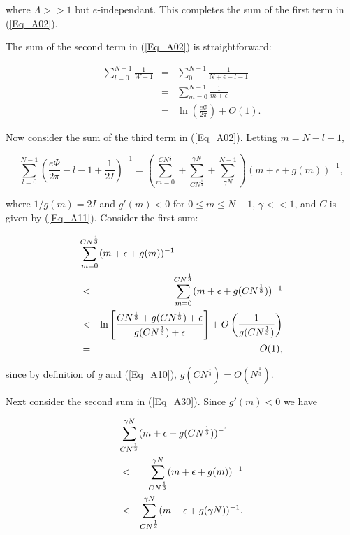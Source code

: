 \documentclass[a4paper,twocolumn,showpacs,preprintnumbers,amsmath,amssymb]{revtex4}
\begin{document}
\noindent
where $\Lambda >> 1$ but $e$-independant. This completes the sum of
the first term in (\ref{Eq_A02}).

The sum of the second term in (\ref{Eq_A02}) is straightforward:

\begin{eqnarray}
\nonumber
\sum^{N-1}_{l=0} \frac{1}{W-1}
  &=& \sum^{N-1}_0 \frac{1}{N + \epsilon - l-1}\\
\nonumber
  &=& \sum^{N-1}_{m=0} \frac{1}{m + \epsilon}\\
\label{Eq_A29}
  &=& \ln \left(\frac{e\Phi}{2\pi}\right) + O(1).
\end{eqnarray}

Now consider the sum of the third term in (\ref{Eq_A02}). Letting
$m = N - l - 1$,

\begin{widetext}
\begin{equation}
\label{Eq_A30}
\sum^{N-1}_{l=0}
  \left( \frac{e\Phi}{2\pi} - l - 1 + \frac{1}{2I} \right)^{-1}
  = \left( \sum^{CN^{\frac{1}{3}}}_{m=0}
  + \sum^{\gamma N}_{CN^{\frac{1}{3}}}
  + \sum^{N-1}_{\gamma N} \right) (m + \epsilon + g(m))^{-1},
\end{equation}
\end{widetext}

\noindent
where $1/g(m) = 2I$ and $g'(m) < 0$ for $0 \le m \le N-1$,
$\gamma << 1$, and $C$ is given by (\ref{Eq_A11}). Consider the first
sum:

\begin{eqnarray}
\nonumber
\lefteqn{\sum^{CN^{\frac{1}{3}}}_{m=0} (m + \epsilon + g(m))^{-1}}\\
\nonumber
  &<& \sum^{CN^{\frac{1}{3}}}_{m=0} (m + \epsilon + g(CN^{\frac{1}{3}}))^{-1}\\
\nonumber
  &<& \ln
  \left[
  \frac{CN^{\frac{1}{3}} + g(CN^{\frac{1}{3}}) + \epsilon}
       {g(CN^{\frac{1}{3}}) + \epsilon}
  \right] + O\left(\frac{1}{g(CN^{\frac{1}{3}})}\right)\\
\label{Eq_A31}
  &=& O(1),
\end{eqnarray} 

\noindent
since by definition of $g$ and (\ref{Eq_A10}),
$g(CN^{\frac{1}{3}}) = O(N^{\frac{1}{3}})$.

Next consider the second sum in (\ref{Eq_A30}). Since $g'(m) < 0$ we
have

\begin{eqnarray}
\nonumber
\lefteqn{\sum^{\gamma N}_{CN^{\frac{1}{3}}}
  (m + \epsilon + g(CN^{\frac{1}{3}}))^{-1}}\\
\nonumber
  &<& \sum^{\gamma N}_{CN^{\frac{1}{3}}} (m + \epsilon + g(m))^{-1}\\
\label{Eq_A32}
  &<& \sum^{\gamma N}_{CN^{\frac{1}{3}}} (m + \epsilon + g(\gamma N))^{-1}.
\end{eqnarray}
\end{document}
